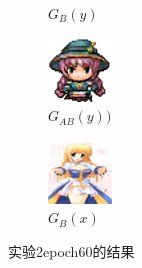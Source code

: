 \documentclass{beamer}
\begin{document}
\begin{frame}
\begin{figure}[htb]
\begin{subfigure}[b]{0.23\linewidth}
        \caption{$G_B(y)$}
      \end{subfigure}
      \begin{subfigure}[b]{0.23\linewidth}
        \includegraphics[width=\linewidth]{exp2_epoch060_rec_B.png}
        \caption{$G_{AB}(y))$}
      \end{subfigure}
      \begin{subfigure}[b]{0.23\linewidth}
        \includegraphics[width=\linewidth]{exp2_epoch060_idt_B.png}
        \caption{$G_B(x)$}
      \end{subfigure}
      \caption{实验2epoch60的结果}
      \label{fig:exp2epoch60}
\end{figure}

\end{frame}
\end{document}
